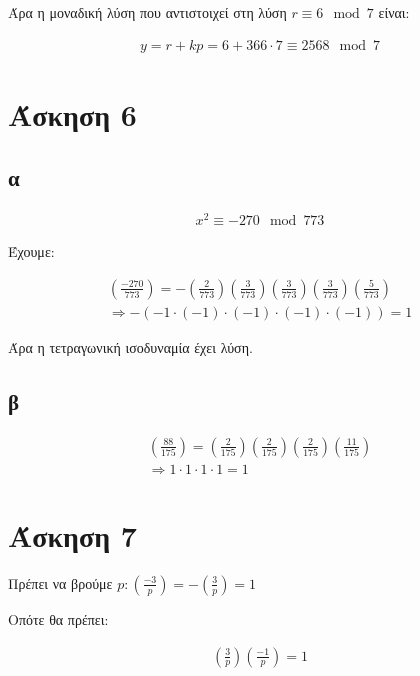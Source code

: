 \documentclass[11pt, oneside]{article}   	%
\begin{document}
Άρα η μοναδική λύση που αντιστοιχεί στη λύση $r \equiv 6 \mod 7$ είναι:

\begin{align*}
	y=r+kp = 6 + 366 \cdot 7 \equiv 2568 \mod 7
\end{align*}

\section{Άσκηση 6}

\subsection{α}

\begin{align*}
	x^2 \equiv -270 \mod 773
\end{align*}

Έχουμε:

\begin{align*}
	\left(\frac{-270}{773}\right) = - \left(\frac{2}{773}\right) \left(\frac{3}{773}\right)\left(\frac{3}{773}\right)\left(\frac{3}{773}\right)\left(\frac{5}{773}\right) \\
	\Rightarrow -(-1 \cdot (-1) \cdot (-1) \cdot (-1) \cdot (-1)) = 1
\end{align*}

Άρα η τετραγωνική ισοδυναμία έχει λύση.

\subsection{β}

\begin{align*}
	\left(\frac{88}{175}\right) = \left(\frac{2}{175}\right) \left(\frac{2}{175}\right) \left(\frac{2}{175}\right) \left(\frac{11}{175}\right)\\
	\Rightarrow 1 \cdot 1 \cdot 1 \cdot 1 = 1
\end{align*}

\section{Άσκηση 7}

Πρέπει να βρούμε $p: \left(\frac{-3}{p}\right) = -\left(\frac{3}{p}\right)=1$

Οπότε θα πρέπει:

\begin{align*}
	\left(\frac{3}{p}\right)\left(\frac{-1}{p}\right) = 1
\end{align*}
\end{document}
